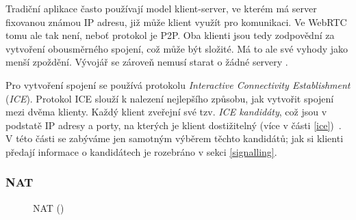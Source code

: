 Tradiční aplikace často používají model klient-server, ve kterém má server
fixovanou známou IP adresu, již může klient využít pro komunikaci. Ve WebRTC
tomu ale tak není, neboť protokol je P2P. Oba klienti jsou tedy zodpovědní za
vytvoření obousměrného spojení, což může být složité. Má to ale své vyhody jako
menší zpoždění. Vývojář se zároveň nemusí starat o žádné servery
\cite{WebRTCForTheCurious}.

Pro vytvoření spojení se používá protokolu \textit{Interactive Connectivity
    Establishment} (\textit{ICE}). Protokol ICE slouží k nalezení nejlepšího
způsobu, jak vytvořit spojení mezi dvěma klienty. Každý klient zveřejní své tzv.
\textit{ICE kandidáty}, což jsou v podstatě IP adresy a porty, na kterých je
klient dostižitelný (více v části \ref{ice})~\cite{WebRTCForTheCurious}. V této
části se zabýváme jen samotným výběrem těchto kandidátů; jak si klienti předají
informace o kandidátech je rozebráno v sekci \ref{signalling}.

\subsubsection{NAT}\label{nat}

\begin{figure}[H]
    \centering
    \caption{NAT (\publicPrivateIP)}
    \label{natFig}
\end{figure}

